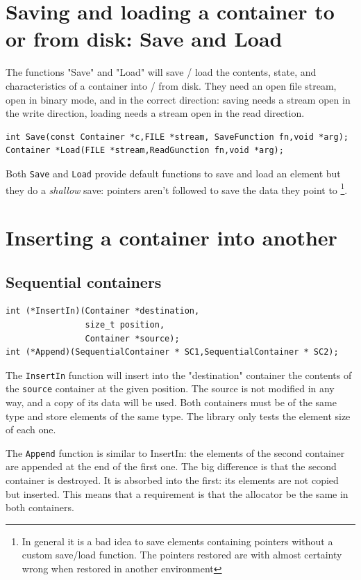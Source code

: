 \documentclass[12pt,a4paper]{memoir} %
\begin{document}
\section{Saving and loading a container to or from disk: Save and Load}
The functions "Save" and "Load" will save / load the contents, state, and characteristics of a container into / from disk. They need an open file stream, open in binary mode, and in the correct direction: saving needs a stream open in the write direction, loading needs a stream open in the read direction.
\begin{verbatim}
int Save(const Container *c,FILE *stream, SaveFunction fn,void *arg);
Container *Load(FILE *stream,ReadGunction fn,void *arg);
\end{verbatim}
Both \texttt{Save} and \texttt{Load} provide default functions to save and load an element but they do a \textsl{shallow} save: pointers aren't followed 
to save the data they point to \footnote{In general it is a bad idea to save elements containing pointers without a custom save/load function. The 
pointers restored are with almost certainty wrong when restored in another environment}.
\section{Inserting a container into another}
\subsection{Sequential containers}
\noindent
\begin{verbatim}
int (*InsertIn)(Container *destination,
                size_t position,
                Container *source);
int (*Append)(SequentialContainer * SC1,SequentialContainer * SC2);
\end{verbatim}
The \texttt{InsertIn} function will insert into the "destination" container the contents of the \verb,source, container at the given position. The source is not modified in any way, and a copy of its data will be used. Both containers must be of the same type and store elements of  the same type. The library only tests the element size of each one.

The \texttt{Append} function is similar to InsertIn: the elements of the second container are appended at the end of the first one. The big difference 
is that the second container is destroyed. It is absorbed into the first: its elements are not copied but inserted. This means that a requirement is
that the allocator be the same in both containers.
\end{document}
